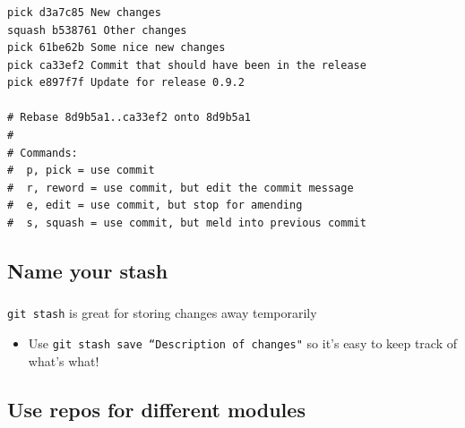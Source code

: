 
\begin{frame}[fragile]
  \frametitle{\insertsubsection}

  \begin{footnotesize}
\begin{verbatim}
pick d3a7c85 New changes
squash b538761 Other changes
pick 61be62b Some nice new changes
pick ca33ef2 Commit that should have been in the release
pick e897f7f Update for release 0.9.2

# Rebase 8d9b5a1..ca33ef2 onto 8d9b5a1
#
# Commands:
#  p, pick = use commit
#  r, reword = use commit, but edit the commit message
#  e, edit = use commit, but stop for amending
#  s, squash = use commit, but meld into previous commit
\end{verbatim}
  \end{footnotesize}

\end{frame}


\subsection{Name your stash}

\begin{frame}
  \begin{center}
    \textbf{\Huge{\insertsubsection}}
  \end{center}
\end{frame}


\begin{frame}
  \frametitle{\insertsubsection}

  \texttt{git stash} is great for storing changes away temporarily

  \begin{itemize}
    \item Use \texttt{git stash save ``Description of changes"} so it's easy to keep track of what's what!
  \end{itemize}

\end{frame}


\subsection{Use repos for different modules}

